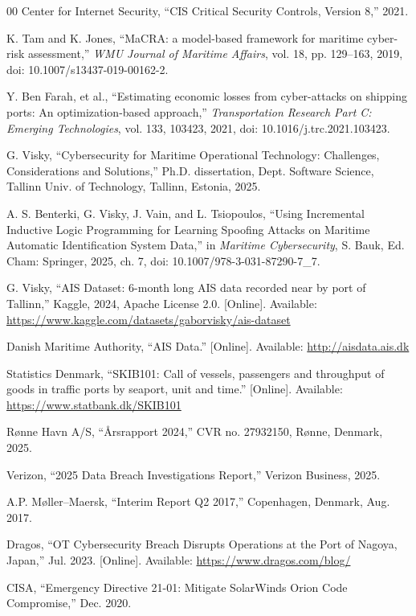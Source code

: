 \documentclass[conference]{IEEEtran}
\begin{document}
\begin{thebibliography}{00}
Center for Internet Security, ``CIS Critical Security Controls, Version 8,'' 2021.

K. Tam and K. Jones, ``MaCRA: a model-based framework for maritime cyber-risk
assessment,'' \emph{WMU Journal of Maritime Affairs}, vol. 18, pp. 129--163, 2019,
doi: 10.1007/s13437-019-00162-2.

Y. Ben Farah, et al., ``Estimating economic losses from cyber-attacks on shipping
ports: An optimization-based approach,'' \emph{Transportation Research Part C:
Emerging Technologies}, vol. 133, 103423, 2021,
doi: 10.1016/j.trc.2021.103423.

G. Visky, ``Cybersecurity for Maritime Operational Technology: Challenges,
Considerations and Solutions,'' Ph.D. dissertation, Dept. Software Science, Tallinn
Univ. of Technology, Tallinn, Estonia, 2025.

A. S. Benterki, G. Visky, J. Vain, and L. Tsiopoulos, ``Using Incremental Inductive
Logic Programming for Learning Spoofing Attacks on Maritime Automatic
Identification System Data,'' in \emph{Maritime Cybersecurity}, S. Bauk, Ed. Cham:
Springer, 2025, ch. 7, doi: 10.1007/978-3-031-87290-7\_7.

G. Visky, ``AIS Dataset: 6-month long AIS data recorded near by port of Tallinn,''
Kaggle, 2024, Apache License 2.0. [Online]. Available:
\url{https://www.kaggle.com/datasets/gaborvisky/ais-dataset}

Danish Maritime Authority, ``AIS Data.'' [Online]. Available:
\url{http://aisdata.ais.dk}

Statistics Denmark, ``SKIB101: Call of vessels, passengers and throughput of goods
in traffic ports by seaport, unit and time.'' [Online]. Available:
\url{https://www.statbank.dk/SKIB101}

Rønne Havn A/S, ``Årsrapport 2024,'' CVR no. 27932150, Rønne, Denmark, 2025.

Verizon, ``2025 Data Breach Investigations Report,'' Verizon Business, 2025.

A.P. Møller--Maersk, ``Interim Report Q2 2017,'' Copenhagen, Denmark, Aug. 2017.

Dragos, ``OT Cybersecurity Breach Disrupts Operations at the Port of Nagoya,
Japan,'' Jul. 2023. [Online]. Available:
\url{https://www.dragos.com/blog/}

CISA, ``Emergency Directive 21-01: Mitigate SolarWinds Orion Code Compromise,''
Dec. 2020.


\end{thebibliography}
\end{document}
